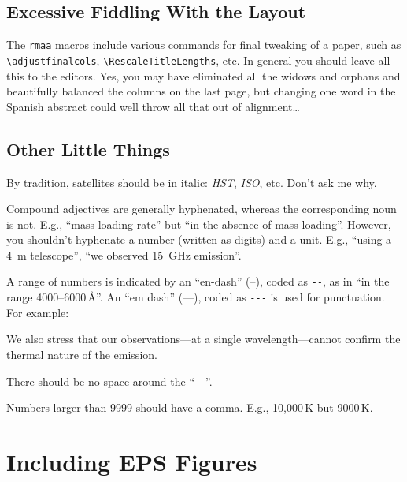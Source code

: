 \documentclass[proceedings, preprint]{rmaa}
\newcommand{\CS}[1]{\texttt{\textbackslash #1}}
\newenvironment{Example}
{\begin{list}{}{\setlength{\leftmargin}{5pt}\setlength{\rightmargin}{5pt}}\item[]}
  {\end{list}}
\begin{document}
\subsection{Excessive Fiddling With the Layout }
\label{sec:fiddling}

The \texttt{rmaa} macros include various commands for final tweaking
of a paper, such as \CS{adjustfinalcols}, \CS{RescaleTitleLengths},
etc. In general you should leave all this to the editors. Yes, you may
have eliminated all the widows and orphans and beautifully balanced the
columns on the last page, but changing one word in the Spanish
abstract could well throw all that out of alignment\dots


\subsection{Other Little Things}
\label{sec:little}

By tradition, satellites should be in italic: \textit{HST},
\textit{ISO}, etc. Don't ask me why. 

Compound adjectives are generally hyphenated, whereas the
corresponding noun is not. E.g., ``mass-loading rate'' but ``in the
absence of mass loading''. However, you shouldn't hyphenate a number
(written as digits) and a unit. E.g., ``using a 4~m telescope'', ``we
observed 15~GHz emission''. 

A range of numbers is indicated by an ``en-dash'' (--), coded as
\verb+--+, as in ``in the range 4000--6000\,\AA''. An ``em dash''
(---), coded as \verb+---+ is used for punctuation. For example: 
\begin{Example}
  We also stress that our observations---at a single
  wavelength---cannot confirm the thermal nature of the emission.
\end{Example}
There should be  no space around the ``---''. 

Numbers larger than 9999 should have a comma. E.g., 10,000\,K but
9000\,K\@.

\section{Including EPS Figures}
\label{sec:EPS}
\end{document}
